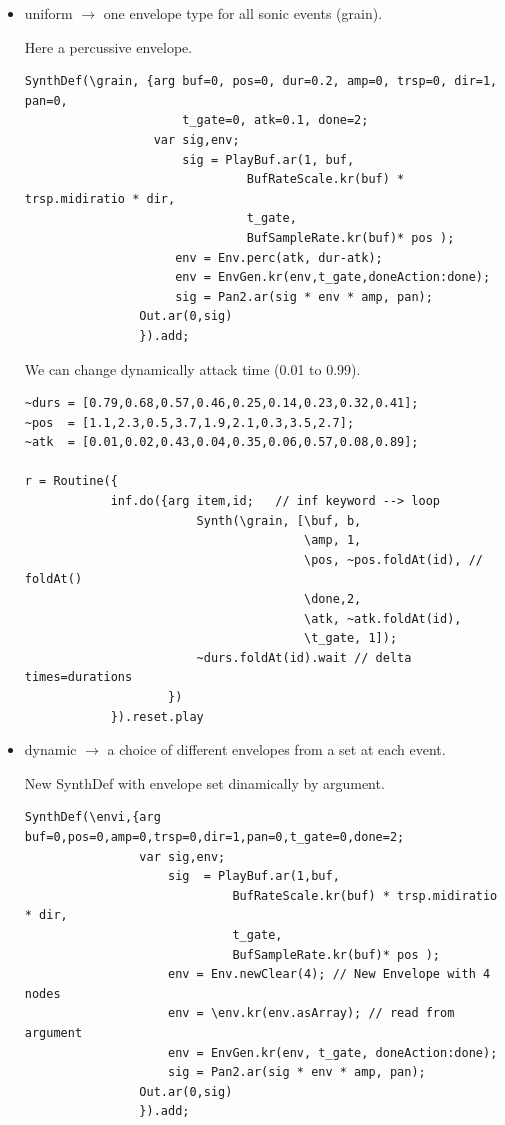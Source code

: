 \begin{itemize}
\item uniform \(\rightarrow\) one envelope type for all sonic events (grain).

  Here a percussive envelope.

\begin{lstlisting}[frame=single] 
SynthDef(\grain, {arg buf=0, pos=0, dur=0.2, amp=0, trsp=0, dir=1, pan=0,
	                  t_gate=0, atk=0.1, done=2;
                  var sig,env;
                      sig = PlayBuf.ar(1, buf,
                               BufRateScale.kr(buf) * trsp.midiratio * dir,
                               t_gate,
                               BufSampleRate.kr(buf)* pos );
                     env = Env.perc(atk, dur-atk);
                     env = EnvGen.kr(env,t_gate,doneAction:done);
                     sig = Pan2.ar(sig * env * amp, pan);
                Out.ar(0,sig)
                }).add;
\end{lstlisting}

We can change dynamically attack time (0.01 to 0.99).

\begin{lstlisting}[frame=single] 
~durs = [0.79,0.68,0.57,0.46,0.25,0.14,0.23,0.32,0.41];       
~pos  = [1.1,2.3,0.5,3.7,1.9,2.1,0.3,3.5,2.7];
~atk  = [0.01,0.02,0.43,0.04,0.35,0.06,0.57,0.08,0.89];      

r = Routine({
            inf.do({arg item,id;   // inf keyword --> loop
                        Synth(\grain, [\buf, b,
                                       \amp, 1,
                                       \pos, ~pos.foldAt(id), // foldAt()
                                       \done,2,
                                       \atk, ~atk.foldAt(id),
                                       \t_gate, 1]);
		                ~durs.foldAt(id).wait // delta times=durations
	                })
            }).reset.play
\end{lstlisting}

\item dynamic \(\rightarrow\) a choice of different envelopes from a set at each event.

New SynthDef with envelope set dinamically by argument.

\begin{lstlisting}[frame=single] 
SynthDef(\envi,{arg buf=0,pos=0,amp=0,trsp=0,dir=1,pan=0,t_gate=0,done=2;
                var sig,env;
                    sig  = PlayBuf.ar(1,buf,
                             BufRateScale.kr(buf) * trsp.midiratio * dir,
                             t_gate,
                             BufSampleRate.kr(buf)* pos );
                    env = Env.newClear(4); // New Envelope with 4 nodes
                    env = \env.kr(env.asArray); // read from argument
                    env = EnvGen.kr(env, t_gate, doneAction:done);
                    sig = Pan2.ar(sig * env * amp, pan);
                Out.ar(0,sig)
                }).add;
\end{lstlisting}


\end{itemize}
